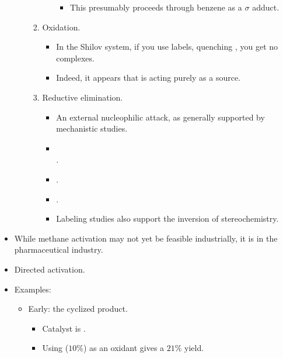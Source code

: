 \documentclass[../notes.tex]{subfiles}
\begin{document}
\begin{itemize}
\begin{itemize}
\begin{enumerate}
\begin{itemize}
\begin{itemize}
                    \item This presumably proceeds through benzene as a $\sigma$ adduct.
                \end{itemize}
            \end{itemize}
            \item Oxidation.
            \begin{itemize}
                \item In the Shilov system, if you use labels, quenching , you get no  complexes.
                \item Indeed, it appears that  is acting purely as a  source.
            \end{itemize}
            \item Reductive elimination.
            \begin{itemize}
                \item An external nucleophilic attack, as generally supported by mechanistic studies.
                \item {}\\ .
                \item {}.
                \item {}.
                \item Labeling studies also support the inversion of stereochemistry.
            \end{itemize}
        \end{enumerate}
    \end{itemize}
    \item While methane activation may not yet be feasible industrially, it is in the pharmaceutical industry.
    \item Directed  activation.
    \item Examples:
    \begin{itemize}
        \item Early:  the cyclized product.
        \begin{itemize}
            \item Catalyst is .
            \item Using  ($10\%$) as an oxidant gives a $21\%$ yield.

\end{itemize}
\end{itemize}
\end{itemize}
\end{document}
